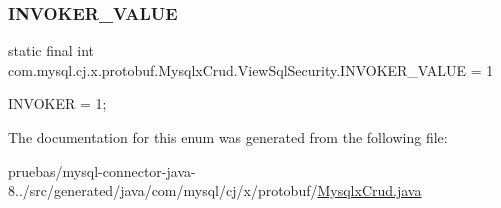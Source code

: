 \subsubsection{\texorpdfstring{I\+N\+V\+O\+K\+E\+R\+\_\+\+V\+A\+L\+UE}{INVOKER\_VALUE}}
{\footnotesize\ttfamily  static  final int com.\+mysql.\+cj.\+x.\+protobuf.\+Mysqlx\+Crud.\+View\+Sql\+Security.\+I\+N\+V\+O\+K\+E\+R\+\_\+\+V\+A\+L\+UE = 1\hspace{0.3cm}{\ttfamily [static]}}

{\ttfamily I\+N\+V\+O\+K\+ER = 1;} 

The documentation for this enum was generated from the following file\+:\begin{DoxyCompactItemize}
\item 
pruebas/mysql-\/connector-\/java-\/8../src/generated/java/com/mysql/cj/x/protobuf/\mbox{\hyperlink{_mysqlx_crud_8java}{Mysqlx\+Crud.\+java}}\end{DoxyCompactItemize}
